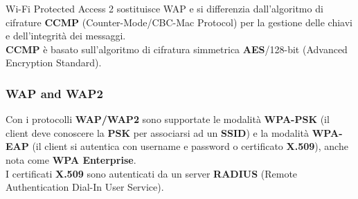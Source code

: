 \documentclass{article}
\begin{document}
Wi-Fi Protected Access 2 sostituisce WAP e si differenzia dall'algoritmo di cifrature \textbf{CCMP}
(Counter-Mode/CBC-Mac Protocol) per la gestione delle chiavi e dell'integrità dei messaggi.
\\
\textbf{CCMP} è basato sull'algoritmo di cifratura simmetrica \textbf{AES}/128-bit (Advanced Encryption Standard).

\subsubsection{WAP and WAP2}

Con i protocolli \textbf{WAP/WAP2} sono supportate le modalità \textbf{WPA-PSK}
(il client deve conoscere la \textbf{PSK} per associarsi ad un \textbf{SSID}) e la modalità
\textbf{WPA-EAP} (il client si autentica con username e password o certificato \textbf{X.509}),
anche nota come \textbf{WPA Enterprise}.
\\
I certificati \textbf{X.509} sono autenticati da un server \textbf{RADIUS}
(Remote Authentication Dial-In User Service).
\end{document}
